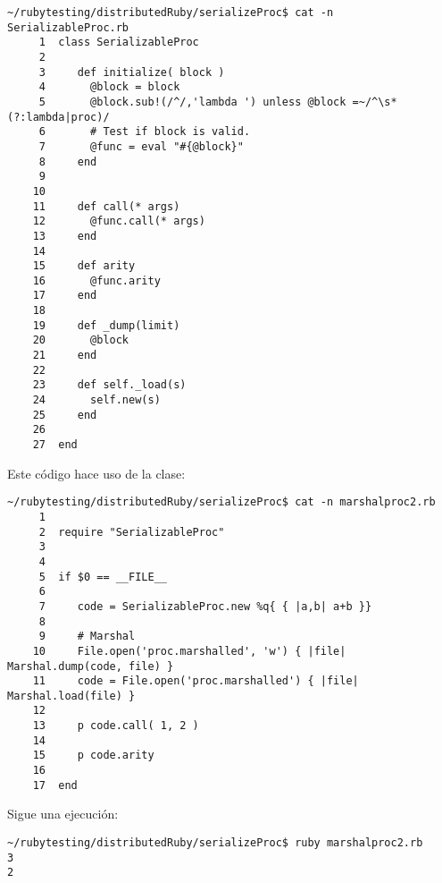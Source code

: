 \begin{verbatim}
~/rubytesting/distributedRuby/serializeProc$ cat -n SerializableProc.rb 
     1  class SerializableProc
     2  
     3     def initialize( block )
     4       @block = block
     5       @block.sub!(/^/,'lambda ') unless @block =~/^\s*(?:lambda|proc)/
     6       # Test if block is valid.
     7       @func = eval "#{@block}"
     8     end
     9  
    10  
    11     def call(* args)
    12       @func.call(* args)
    13     end
    14  
    15     def arity
    16       @func.arity
    17     end
    18  
    19     def _dump(limit)
    20       @block
    21     end
    22  
    23     def self._load(s)
    24       self.new(s)
    25     end
    26  
    27  end
\end{verbatim}
Este código hace uso de la clase:
\begin{verbatim}
~/rubytesting/distributedRuby/serializeProc$ cat -n marshalproc2.rb 
     1  
     2  require "SerializableProc"
     3  
     4  
     5  if $0 == __FILE__
     6  
     7     code = SerializableProc.new %q{ { |a,b| a+b }}
     8  
     9     # Marshal
    10     File.open('proc.marshalled', 'w') { |file| Marshal.dump(code, file) }
    11     code = File.open('proc.marshalled') { |file| Marshal.load(file) }
    12  
    13     p code.call( 1, 2 )
    14  
    15     p code.arity
    16  
    17  end
\end{verbatim}
Sigue una ejecución:
\begin{verbatim}
~/rubytesting/distributedRuby/serializeProc$ ruby marshalproc2.rb 
3
2
\end{verbatim}

%

